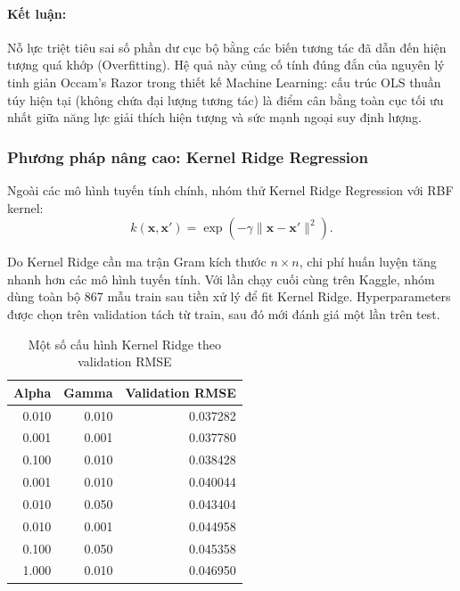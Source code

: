 \paragraph{Kết luận:}
Nỗ lực triệt tiêu sai số phần dư cục bộ bằng các biến tương tác đã dẫn đến hiện tượng quá khớp (Overfitting). 
Hệ quả này củng cố tính đúng đắn của nguyên lý tinh giản Occam's Razor trong thiết kế Machine Learning: 
cấu trúc OLS thuần túy hiện tại (không chứa đại lượng tương tác) là điểm cân bằng toàn cục tối ưu nhất 
giữa năng lực giải thích hiện tượng và sức mạnh ngoại suy định lượng.

\subsubsection{Phương pháp nâng cao: Kernel Ridge Regression}

Ngoài các mô hình tuyến tính chính, nhóm thử Kernel Ridge Regression với RBF kernel:
\begin{equation}
    k(\mathbf{x},\mathbf{x}')
    = \exp\left(-\gamma\|\mathbf{x}-\mathbf{x}'\|^2\right).
\end{equation}

Do Kernel Ridge cần ma trận Gram kích thước $n\times n$, chi phí huấn luyện tăng nhanh hơn
các mô hình tuyến tính. Với lần chạy cuối cùng trên Kaggle, nhóm dùng toàn bộ 867 mẫu train sau
tiền xử lý để fit Kernel Ridge. Hyperparameters được chọn trên validation tách từ train, sau đó
mới đánh giá một lần trên test.

\begin{table}[H]
\centering
\caption{Một số cấu hình Kernel Ridge theo validation RMSE}
\label{tab:part2_kernel_search}
\begin{tabular}{@{}rrr@{}}
\hline
\textbf{Alpha} & \textbf{Gamma} & \textbf{Validation RMSE} \\
\hline
0.010 & 0.010 & 0.037282 \\
0.001 & 0.001 & 0.037780 \\
0.100 & 0.010 & 0.038428 \\
0.001 & 0.010 & 0.040044 \\
0.010 & 0.050 & 0.043404 \\
0.010 & 0.001 & 0.044958 \\
0.100 & 0.050 & 0.045358 \\
1.000 & 0.010 & 0.046950 \\
\hline
\end{tabular}
\end{table}

